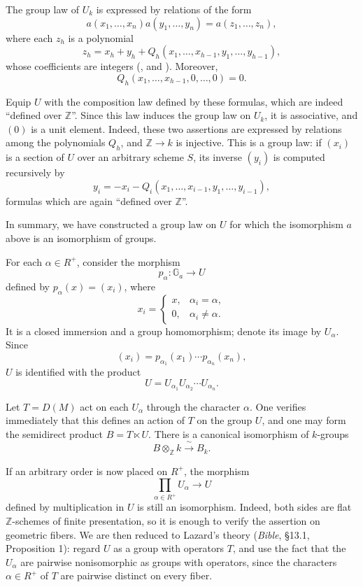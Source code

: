 
The group law of \(U_k\) is expressed by relations of the form
\[
 a(x_1,\ldots,x_n)a(y_1,\ldots,y_n)=a(z_1,\ldots,z_n),
\]
where each \(z_h\) is a polynomial
\[
 z_h=x_h+y_h+
 Q_h(x_1,\ldots,x_{h-1},y_1,\ldots,y_{h-1}),
\]
whose coefficients are integers (, and ). Moreover,
\[
 Q_h(x_1,\ldots,x_{h-1},0,\ldots,0)=0.
\]

Equip \(U\) with the composition law defined by these formulas, which are
indeed ``defined over \(\mathbb Z\)''. Since this law induces the group law
on \(U_k\), it is associative, and \((0)\) is a unit element. Indeed, these
two assertions are expressed by relations among the polynomials \(Q_h\),
and \(\mathbb Z\to k\) is injective. This is a group law: if \((x_i)\) is
a section of \(U\) over an arbitrary scheme \(S\), its inverse \((y_i)\)
is computed recursively by
\[
 y_i=-x_i-Q_i(x_1,\ldots,x_{i-1},y_1,\ldots,y_{i-1}),
\]
formulas which are again ``defined over \(\mathbb Z\)''.

In summary, we have constructed a group law on \(U\) for which the
isomorphism \(a\) above is an isomorphism of groups.

For each \(\alpha\in R^+\), consider the morphism
\[
 p_\alpha\colon\mathbb G_a\longrightarrow U
\]
defined by \(p_\alpha(x)=(x_i)\), where
\[
 x_i=
 \begin{cases}
 x,&\alpha_i=\alpha,\\
 0,&\alpha_i\ne\alpha.
 \end{cases}
\]
It is a closed immersion and a group homomorphism; denote its image by
\(U_\alpha\). Since
\[
 (x_i)=p_{\alpha_1}(x_1)\cdots p_{\alpha_n}(x_n),
\]
\(U\) is identified with the product
\[
 U=U_{\alpha_1}U_{\alpha_2}\cdots U_{\alpha_n}.
\]


Let \(T=D(M)\) act on each \(U_\alpha\) through the character \(\alpha\).
One verifies immediately that this defines an action of \(T\) on the
group \(U\), and one may form the semidirect product \(B=T\ltimes U\).
There is a canonical isomorphism of \(k\)-groups
\[
 B\otimes_{\mathbb Z}k\xrightarrow{\ \sim\ }B_k.
\]

If an arbitrary order is now placed on \(R^+\), the morphism
\[
 \prod_{\alpha\in R^+}U_\alpha\longrightarrow U
\]
defined by multiplication in \(U\) is still an isomorphism. Indeed, both
sides are flat \(\mathbb Z\)-schemes of finite presentation, so it is
enough to verify the assertion on geometric fibers. We are then reduced
to Lazard's theory (\textit{Bible}, \S13.1, Proposition 1): regard \(U\)
as a group with operators \(T\), and use the fact that the \(U_\alpha\)
are pairwise nonisomorphic as groups with operators, since the characters
\(\alpha\in R^+\) of \(T\) are pairwise distinct on every fiber.

